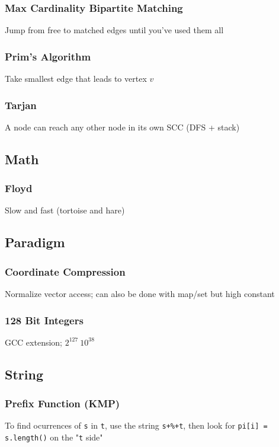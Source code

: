 \documentclass[12pt, a4paper, twoside]{article}
\begin{document}
\subsubsection{Max Cardinality Bipartite Matching}
Jump from free to matched edges until you've used them all

\subsubsection{Prim's Algorithm}
Take smallest edge that leads to vertex $v$

\subsubsection{Tarjan}
A node can reach any other node in its own SCC (DFS + stack)

\subsection{Math}
\subsubsection{Floyd}
Slow and fast (tortoise and hare)

\subsection{Paradigm}
\subsubsection{Coordinate Compression}
Normalize vector access; can also be done with map/set but high constant

\subsubsection{128 Bit Integers}
GCC extension; $2^{127} ~ 10^{38}$

\subsection{String}
\subsubsection{Prefix Function (KMP)}
To find ocurrences of \texttt{s} in \texttt{t}, use the string \texttt{s+\%+t}, then look for \texttt{pi[i] = s.length()} on the "\texttt{t} side"
\end{document}
